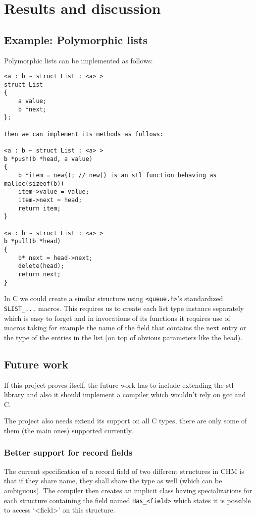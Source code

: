 
\chapter{Results and discussion}

\section{Example: Polymorphic lists}

Polymorphic lists can be implemented as follows:

\begin{lstlisting}
<a : b ~ struct List : <a> >
struct List
{
    a value;
    b *next;
};

Then we can implement its methods as follows:

<a : b ~ struct List : <a> >
b *push(b *head, a value)
{
    b *item = new(); // new() is an stl function behaving as malloc(sizeof(b))
    item->value = value;
    item->next = head;
    return item;
}

<a : b ~ struct List : <a> >
b *pull(b *head)
{
    b* next = head->next;
    delete(head);
    return next;
}
\end{lstlisting}

In C we could create a similar structure using \lstinline{<queue.h>}'s standardized \lstinline{SLIST_...} macros.
This requires us to create each list type instance separately which is easy to forget
and in invocations of its functions it requires use of macros taking for example the name of the field that
contains the next entry or the type of the entries in the list (on top of obvious parameters like the head).

\section{Future work}

If this project proves itself, the future work has to include extending the stl library and also
it should implement a compiler which wouldn't rely on gcc and C.

The project also needs extend its support on all C types, there are only some of them (the main ones)
supported currently.

\subsection{Better support for record fields}

The current specification of a record field of two different structures in CHM is that if they share name, they shall share the type as well
(which can be ambiguous). The compiler then creates an implicit class having specializations for each structure containing the field
named \lstinline{Has_<field>} which states it is possible to access `<field>' on this structure.

